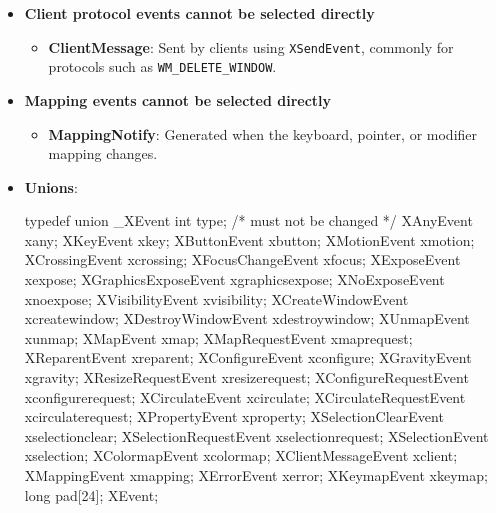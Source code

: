 \documentclass{report}
\begin{document}
\begin{itemize}
        \item \textbf{Client protocol events cannot be selected directly}
            \bigbreak \noindent
            \begin{itemize}
                \item \textbf{ClientMessage}: Sent by clients using \texttt{XSendEvent}, commonly for protocols such as \texttt{WM\_DELETE\_WINDOW}.
            \end{itemize}
        \item \textbf{Mapping events cannot be selected directly}
            \bigbreak \noindent
            \begin{itemize}
                \item \textbf{MappingNotify}: Generated when the keyboard, pointer, or modifier mapping changes.
            \end{itemize}
        \item \textbf{Unions}: 
            \begin{cppcode}
                typedef union _XEvent {
                    int type;           /* must not be changed */
                    XAnyEvent xany;
                    XKeyEvent xkey;
                    XButtonEvent xbutton;
                    XMotionEvent xmotion;
                    XCrossingEvent xcrossing;
                    XFocusChangeEvent xfocus;
                    XExposeEvent xexpose;
                    XGraphicsExposeEvent xgraphicsexpose;
                    XNoExposeEvent xnoexpose;
                    XVisibilityEvent xvisibility;
                    XCreateWindowEvent xcreatewindow;
                    XDestroyWindowEvent xdestroywindow;
                    XUnmapEvent xunmap;
                    XMapEvent xmap;
                    XMapRequestEvent xmaprequest;
                    XReparentEvent xreparent;
                    XConfigureEvent xconfigure;
                    XGravityEvent xgravity;
                    XResizeRequestEvent xresizerequest;
                    XConfigureRequestEvent xconfigurerequest;
                    XCirculateEvent xcirculate;
                    XCirculateRequestEvent xcirculaterequest;
                    XPropertyEvent xproperty;
                    XSelectionClearEvent xselectionclear;
                    XSelectionRequestEvent xselectionrequest;
                    XSelectionEvent xselection;
                    XColormapEvent xcolormap;
                    XClientMessageEvent xclient;
                    XMappingEvent xmapping;
                    XErrorEvent xerror;
                    XKeymapEvent xkeymap;
                    long pad[24];
                } XEvent;
            \end{cppcode}


\end{itemize}
\end{document}
